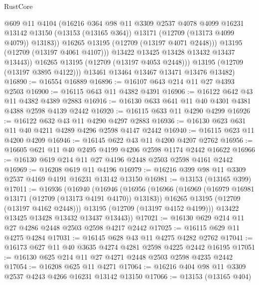 \begin{lexlean}{RustCore}
\begin{coremodule}
                    @609
                    @11
                    @4104
                    (@16216
                      @364
                      @98
                      @11
                      @3309
                      @2537
                      @4078
                      @4099
                      @16231
                      @13142
                      @13150
                      (@13153 (@13165 @364))
                      @13171
                      (@12709 (@13173 @4099 @4079))
                      @13183))
                  @16265
                  @13195
                  (@12709 (@13197 @4071 @2448)))
                @13195
                (@12709 (@13197 @4061 @4107)))
              @13422
              @13425
              @13428
              @13432
              @13437
              @13443))
          @16265
          @13195
          (@12709 (@13197 @4053 @2448)))
        @13195
        (@12709 (@13197 @3895 @4122)))
      @13461
      @13464
      @13467
      @13471
      @13476
      @13482)
@16890 := @16554 @16889
@16896 := @16107 @643 @214 @11 @27 @4393 @2503
@16900 := @16115 @643 @11 @4382 @4391
@16906 := @16122 @642 @43 @11 @4382 @4389 @2883
@16916 := @16130 @633 @641 @11 @40 @4301 @4381 @4388 @2598 @4139 @2442
@16920 := @16115 @633 @11 @4290 @4299
@16926 := @16122 @632 @43 @11 @4290 @4297 @2883
@16936 := @16130 @623 @631 @11 @40 @4211 @4289 @4296 @2598 @4147 @2442
@16940 := @16115 @623 @11 @4200 @4209
@16946 := @16145 @622 @43 @11 @4200 @4207 @2762
@16956 := @16605 @621 @11 @40 @2495 @4199 @4206 @2598 @1174 @2442 @16622
@16966 := @16130 @619 @214 @11 @27 @4196 @2448 @2503 @2598 @4161 @2442
@16969 := @16208 @619 @11 @4196
@16979 := @16216 @399 @98 @11 @3309 @2537 @4169 @4191 @16231 @13142 @13150
@16981 := @13153 (@13165 @399)
@17011 := @16936
    (@16940
      (@16946
        (@16956
          (@16966
            (@16969 (@16979 @16981 @13171 (@12709 (@13173 @4191 @4170)) @13183))
            @16265
            @13195
            (@12709 (@13197 @4162 @2448)))
          @13195
          (@12709 (@13197 @4152 @4199)))
        @13422
        @13425
        @13428
        @13432
        @13437
        @13443))
@17021 := @16130 @629 @214 @11 @27 @4286 @2448 @2503 @2598 @4217 @2442
@17025 := @16115 @629 @11 @4275 @4284
@17031 := @16145 @628 @43 @11 @4275 @4282 @2762
@17041 := @16173 @627 @11 @40 @3635 @4274 @4281 @2598 @4225 @2442 @16195
@17051 := @16130 @625 @214 @11 @27 @4271 @2448 @2503 @2598 @4235 @2442
@17054 := @16208 @625 @11 @4271
@17064 := @16216 @404 @98 @11 @3309 @2537 @4243 @4266 @16231 @13142 @13150
@17066 := @13153 (@13165 @404)

\end{coremodule}
\end{lexlean}
